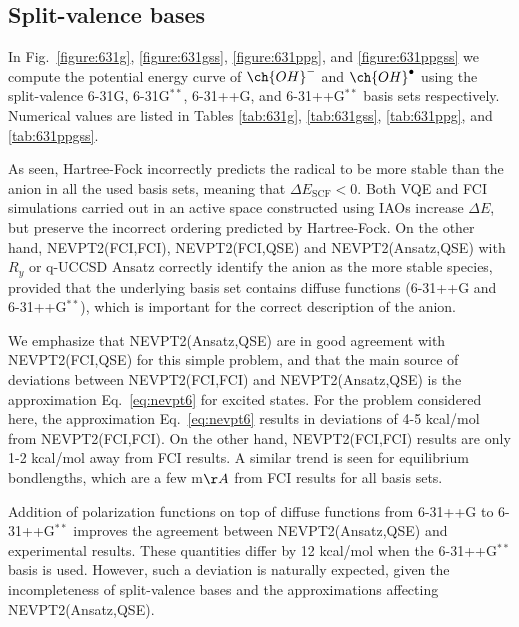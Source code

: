 \documentclass[aps,pra,twocolumn]{revtex4-2}
\newcommand{\OHradical}{\ch{OH}^\bullet}
\newcommand{\OHanion}{\ch{OH}^-}
\begin{document}
\subsection{Split-valence bases}

In Fig.~\ref{figure:631g}, \ref{figure:631gss}, \ref{figure:631ppg}, and \ref{figure:631ppgss} we compute the potential energy curve of $\OHanion$ and $\OHradical$
using the split-valence 6-31G, 6-31G${}^{**}$, 6-31++G, and 6-31++G${}^{**}$ basis sets respectively.
Numerical values are listed in Tables \ref{tab:631g}, \ref{tab:631gss}, \ref{tab:631ppg}, and \ref{tab:631ppgss}.

As seen, Hartree-Fock incorrectly predicts the radical to be more stable than the anion in all the used basis sets, meaning that $\Delta E_{\mathrm{SCF}} < 0$. Both
VQE and FCI simulations carried out in an active space constructed using IAOs increase $\Delta E$, but preserve the incorrect ordering predicted by Hartree-Fock.
On the other hand, NEVPT2(FCI,FCI), NEVPT2(FCI,QSE) and NEVPT2(Ansatz,QSE) with $R_y$ or q-UCCSD Ansatz correctly identify the anion as the more stable species,
provided that the underlying basis set contains diffuse functions (6-31++G and 6-31++G${}^{**}$), which is important for the correct description of the anion.

We emphasize that NEVPT2(Ansatz,QSE) are in good agreement with NEVPT2(FCI,QSE) for this simple problem, 
and that the main source of deviations between NEVPT2(FCI,FCI) and NEVPT2(Ansatz,QSE) is the approximation Eq.~\eqref{eq:nevpt6} for excited states.
For the problem considered here, the approximation Eq.~\eqref{eq:nevpt6} results in deviations of 4-5 kcal/mol from NEVPT2(FCI,FCI). 
On the other hand, NEVPT2(FCI,FCI) results are only 1-2 kcal/mol away from FCI results. A similar trend is seen for equilibrium bondlengths, which are a few m$\AA$ from FCI results for all basis sets.

Addition of polarization functions on top of diffuse functions from 6-31++G to 6-31++G$^{**}$ improves the agreement between NEVPT2(Ansatz,QSE) and experimental results. 
These quantities differ by 12 kcal/mol when the 6-31++G${}^{**}$ basis is used.
However, such a deviation is naturally expected, given the incompleteness of split-valence bases and the approximations affecting NEVPT2(Ansatz,QSE).

\end{document}
